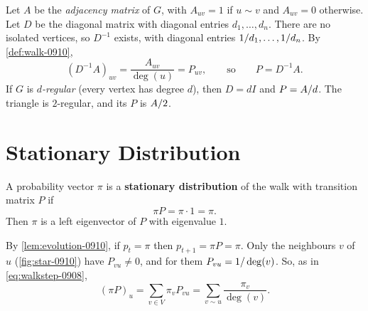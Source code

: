 Let $A$ be the \emph{adjacency matrix} of $G$, with $A_{uv} = 1$ if $u \sim v$ and $A_{uv} = 0$
otherwise. Let $D$ be the diagonal matrix with diagonal entries $d_1, \dots, d_n$. There are no
isolated vertices, so $D^{-1}$ exists, with diagonal entries $1/d_1, \dots, 1/d_n$.
By \cref{def:walk-0910},
\[(D^{-1} A)_{uv} = \frac{A_{uv}}{\deg(u)} = P_{uv}, \qquad \text{so} \qquad P = D^{-1} A.\]
If $G$ is \emph{$d$-regular} (every vertex has degree $d$), then $D = d I$ and $P = A/d$.
The triangle is $2$-regular, and its $P$ is $A/2$.

\section{Stationary Distribution}

\begin{definition}\label{def:stationary-0910}
    A probability vector $\pi$ is a \textbf{stationary distribution} of the walk with transition matrix $P$
    if
    \[\pi P = \pi \cdot 1 = \pi.\]
    Then $\pi$ is a left eigenvector of $P$ with eigenvalue $1$.
\end{definition}

By \cref{lem:evolution-0910}, if $p_t = \pi$ then $p_{t+1} = \pi P = \pi$. Only the neighbours $v$
of $u$ (\cref{fig:star-0910}) have $P_{vu} \neq 0$, and for them $P_{vu} = 1/\deg(v)$. So,
as in \cref{eq:walkstep-0908},
\begin{equation}\label{eq:piP-0910}
    (\pi P)_u = \sum_{v \in V} \pi_v P_{vu} = \sum_{v \sim u} \frac{\pi_v}{\deg(v)}.
\end{equation}

